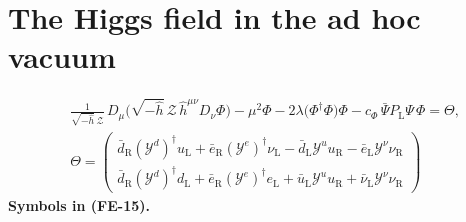 \documentclass[
  10pt,
]{article}
\begin{document}
\hypertarget{the-higgs-field-in-the-ad-hoc-vacuum}{%
\section{The Higgs field in the ad hoc
vacuum}\label{the-higgs-field-in-the-ad-hoc-vacuum}}

\[
\begin{aligned}
&\frac{1}{\sqrt{-\hat h}\,\mathcal{Z}}\,D_\mu\big(\sqrt{-\hat h}\,\mathcal{Z}\,\hat h^{\mu\nu}D_\nu\Phi\big) - \mu^2\Phi
 - 2\lambda\big(\Phi^\dagger\Phi\big)\Phi - c_\Phi\,\bar\Psi P_{\mathrm{L}}\Psi\,\Phi = \Theta,\\
&\Theta = \begin{pmatrix}\bar d_{\mathrm{R}}(\mathcal{Y}^{d})^\dagger u_{\mathrm{L}} + \bar e_{\mathrm{R}}(\mathcal{Y}^{e})^\dagger\nu_{\mathrm{L}}
 - \bar d_{\mathrm{L}}\mathcal{Y}^{u}u_{\mathrm{R}} - \bar e_{\mathrm{L}}\mathcal{Y}^{\nu}\nu_{\mathrm{R}}\\
 \bar d_{\mathrm{R}}(\mathcal{Y}^{d})^\dagger d_{\mathrm{L}} + \bar e_{\mathrm{R}}(\mathcal{Y}^{e})^\dagger e_{\mathrm{L}}
 + \bar u_{\mathrm{L}}\mathcal{Y}^{u}u_{\mathrm{R}} + \bar\nu_{\mathrm{L}}\mathcal{Y}^{\nu}\nu_{\mathrm{R}}\end{pmatrix}
\end{aligned} \tag{FE-15}
\] \textbf{Symbols in (FE-15).}
\end{document}
